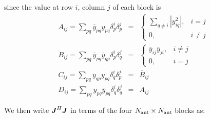 \documentclass[useAMS,usenatbib]{mn2e}
\newcommand{\mat}[1]{{\bmath{#1}}}
\newcommand{\JJ}{\mat{J}} %
\begin{document}
since the value at row $i$, column $j$ of each block is
\begin{eqnarray}
A_{ij} = \sum_{pq} \bar{y}_{pq} y_{pq} \delta^{i}_p \delta^{j}_p &=& 
  \left \{ \begin{array}{cc}
        \sum\limits_{q\ne i} |y_{iq}^2|, & \scriptstyle i=j \\
        0,  & \scriptstyle  i\ne j
  \end{array} \right .\nonumber\\ 
B_{ij} = \sum_{pq} \bar{y}_{pq} \bar{y}_{qp} \delta^{i}_p \delta^{j}_q &=& 
  \left \{ \begin{array}{cc}
      \bar{y}_{ij} \bar{y}_{ji}, & \scriptstyle i\ne j\\
      0, & \scriptstyle i=j
  \end{array} \right .\nonumber\\ 
C_{ij} = \sum_{pq} y_{qp} y_{pq} \delta^{i}_q \delta^{j}_p &=& 
  \bar{B}_{ij} \nonumber\\
D_{ij} = \sum_{pq} y_{pq} \bar{y}_{pq} \delta^{i}_q \delta^{j}_q &=& A_{ij} 
\label{eq:JHJ:DI:ABCD1}
\end{eqnarray}

We then write $\JJ^H\JJ$ in terms of the four $N_\mathrm{ant}\times N_\mathrm{ant}$ blocks as:

\newcommand{\JHJblocksFull}[4]{
\Matrix{c@{}c@{}c}{
 #1 & \bigg |~ & #2 \\[10pt]
 \hline \\[-8pt]
 #3 & \bigg |~ & #4 }
}

\newcommand{\JHJblocks}[2]{
\Matrix{c@{}c@{}c}{
 #1 & \big |~ & \nearrow^H \\
 \hline \\[-8pt]
 #2 & \bigg |~ & \searrow~~ }
}
\end{document}
